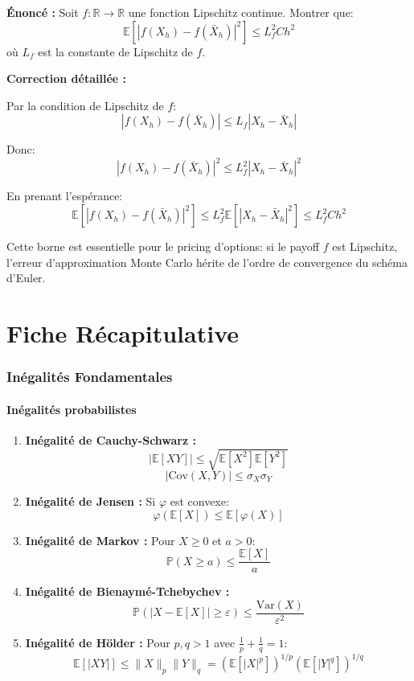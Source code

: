\documentclass[12pt,a4paper]{article}
\theoremstyle{definition}
\newcommand{\E}{\mathbb{E}}
\newcommand{\Var}{\mathrm{Var}}
\newcommand{\Cov}{\mathrm{Cov}}
\newcommand{\R}{\mathbb{R}}
\newcommand{\prob}{\mathbb{P}}
\begin{document}
\textbf{Énoncé :} Soit $f : \R \to \R$ une fonction Lipschitz continue. Montrer que:
\[
\E[|f(X_h) - f(\bar{X}_h)|^2] \leq L_f^2 C h^2
\]
où $L_f$ est la constante de Lipschitz de $f$.

\textbf{Correction détaillée :}

Par la condition de Lipschitz de $f$:
\[
|f(X_h) - f(\bar{X}_h)| \leq L_f |X_h - \bar{X}_h|
\]

Donc:
\[
|f(X_h) - f(\bar{X}_h)|^2 \leq L_f^2 |X_h - \bar{X}_h|^2
\]

En prenant l'espérance:
\[
\E[|f(X_h) - f(\bar{X}_h)|^2] \leq L_f^2 \E[|X_h - \bar{X}_h|^2] \leq L_f^2 C h^2
\]

\begin{astuce}
Cette borne est essentielle pour le pricing d'options: si le payoff $f$ est Lipschitz, l'erreur d'approximation Monte Carlo hérite de l'ordre de convergence du schéma d'Euler.
\end{astuce}

\newpage
\part{Fiche Récapitulative}

\section{Inégalités Fondamentales}

\subsection{Inégalités probabilistes}

\begin{enumerate}
    \item \textbf{Inégalité de Cauchy-Schwarz :}
    \[
    |\E[XY]| \leq \sqrt{\E[X^2]\E[Y^2]}
    \]
    \[
    |\Cov(X,Y)| \leq \sigma_X \sigma_Y
    \]
    
    \item \textbf{Inégalité de Jensen :} Si $\varphi$ est convexe:
    \[
    \varphi(\E[X]) \leq \E[\varphi(X)]
    \]
    
    \item \textbf{Inégalité de Markov :} Pour $X \geq 0$ et $a > 0$:
    \[
    \prob(X \geq a) \leq \frac{\E[X]}{a}
    \]
    
    \item \textbf{Inégalité de Bienaymé-Tchebychev :}
    \[
    \prob(|X - \E[X]| \geq \varepsilon) \leq \frac{\Var(X)}{\varepsilon^2}
    \]
    
    \item \textbf{Inégalité de Hölder :} Pour $p, q > 1$ avec $\frac{1}{p} + \frac{1}{q} = 1$:
    \[
    \E[|XY|] \leq \|X\|_p \|Y\|_q = (\E[|X|^p])^{1/p} (\E[|Y|^q])^{1/q}
    \]
\end{enumerate}
\end{document}
